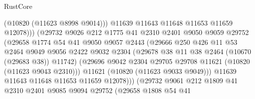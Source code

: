\begin{lexlean}{RustCore}
\begin{coremodule}
                                    (@10820 (@11623 @8998 @9014)))
                                  @11639
                                  @11643
                                  @11648
                                  @11653
                                  @11659
                                  @12078)))
                            (@29732
                              @9026
                              @212
                              @1775
                              @41
                              @2310
                              @2401
                              @9050
                              @9059
                              @29752
                              (@29658
                                @1774
                                @54
                                @41
                                @9050
                                @9057
                                @2443
                                (@29666
                                  @250
                                  @426
                                  @11
                                  @53
                                  @2464
                                  @9049
                                  @9056
                                  @2422
                                  @9032
                                  @2304
                                  (@29678 @38 @11 @38 @2464 (@10670 (@29683 @38)) @11742)
                                  (@29696
                                    @9042
                                    @2304
                                    @29705
                                    @29708
                                    @11621
                                    (@10820 (@11623 @9043 @2310)))
                                  @11621
                                  (@10820 (@11623 @9033 @9049)))
                                @11639
                                @11643
                                @11648
                                @11653
                                @11659
                                @12078)))
                          (@29732
                            @9061
                            @212
                            @1809
                            @41
                            @2310
                            @2401
                            @9085
                            @9094
                            @29752
                            (@29658
                              @1808
                              @54
                              @41

\end{coremodule}
\end{lexlean}
